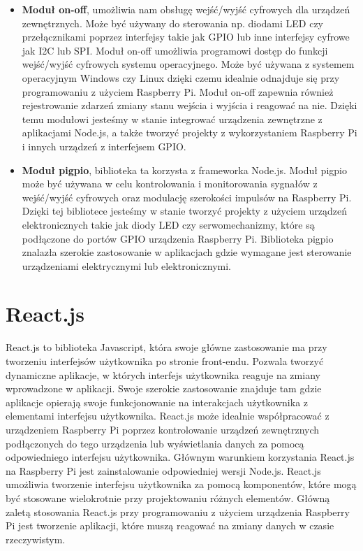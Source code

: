 \begin{itemize}  
	\item \textbf{Moduł on-off}, umożliwia nam obsługę wejść/wyjść cyfrowych dla urządzeń zewnętrznych. Może być używany do sterowania np. diodami LED czy przełącznikami poprzez interfejsy takie jak GPIO lub inne interfejsy cyfrowe jak I2C lub SPI. Moduł on-off umożliwia programowi dostęp do funkcji wejść/wyjść cyfrowych systemu operacyjnego. Może być używana z systemem operacyjnym Windows czy Linux dzięki czemu idealnie odnajduje się przy programowaniu z użyciem Raspberry Pi. Moduł on-off zapewnia również rejestrowanie zdarzeń zmiany stanu wejścia i wyjścia i reagować na nie. Dzięki temu modułowi jesteśmy w stanie integrować urządzenia zewnętrzne z aplikacjami Node.js, a także tworzyć projekty z wykorzystaniem Raspberry Pi i innych urządzeń z interfejsem GPIO.
	\\
	\item \textbf{Moduł pigpio}, biblioteka ta korzysta z frameworka Node.js. Moduł pigpio może być używana w celu kontrolowania i monitorowania sygnałów z wejść/wyjść cyfrowych oraz modulację szerokości impulsów na Raspberry Pi. Dzięki tej bibliotece jesteśmy w stanie tworzyć projekty z użyciem urządzeń elektronicznych takie jak diody LED czy serwomechanizmy, które są podłączone do portów GPIO urządzenia Raspberry Pi. Biblioteka pigpio znalazła szerokie zastosowanie w aplikacjach gdzie wymagane jest sterowanie urządzeniami elektrycznymi lub elektronicznymi.
	\\
\end{itemize}

\section{React.js}
React.js to biblioteka Javascript, która swoje główne zastosowanie ma przy tworzeniu interfejsów użytkownika po stronie front-endu. Pozwala tworzyć dynamiczne aplikacje, w których interfejs użytkownika reaguje na zmiany wprowadzone w aplikacji. Swoje szerokie zastosowanie znajduje tam gdzie aplikacje opierają swoje funkcjonowanie na interakcjach użytkownika z elementami interfejsu użytkownika. React.js może idealnie współpracować z urządzeniem Raspberry Pi poprzez kontrolowanie urządzeń zewnętrznych podłączonych do tego urządzenia lub wyświetlania danych za pomocą odpowiedniego interfejsu użytkownika. Głównym warunkiem korzystania React.js na Raspberry Pi jest zainstalowanie odpowiedniej wersji Node.js. React.js umożliwia tworzenie interfejsu użytkownika za pomocą komponentów, które mogą być stosowane wielokrotnie przy projektowaniu różnych elementów. Główną zaletą stosowania React.js przy programowaniu z użyciem urządzenia Raspberry Pi jest tworzenie aplikacji, które muszą reagować na zmiany danych w czasie rzeczywistym.
